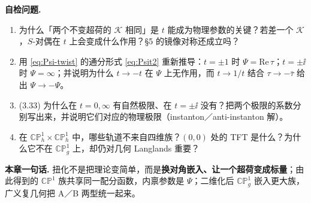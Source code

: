\noindent\textbf{自检问题.}
\begin{enumerate}[label=\arabic*.,itemsep=2pt,topsep=3pt]
\item 为什么「两个不变超荷的 $\mathcal K$ 相同」是 $t$ 能成为物理参数的关键？若差一个 $\mathcal K$，$S$-对偶在 $t$ 上会变成什么作用？§5 的镜像对称还成立吗？
\item 用 \eqref{eq:Psi-twist} 的通分形式 \eqref{eq:Psit2} 重新推导：$t=\pm1$ 时 $\Psi=\mathrm{Re}\,\tau$；$t=\pm\ii$ 时 $\Psi=\infty$；并说明为什么 $t\to-t$ 在 $\Psi$ 上无作用，而 $t\to1/t$ 结合 $\tau\to-\bar\tau$ 给出 $\Psi\to-\Psi$。
\item (3.33) 为什么在 $t=0,\infty$ 有自然极限、在 $t=\pm\ii$ 没有？把两个极限的系数分别写出来，并说明它们对应的物理极限（instanton／anti-instanton 解）。
\item 在 $\mathbb{CP}^1_h\times\mathbb{CP}^1_h$ 中，哪些轨道不来自四维族？$(0,0)$ 处的 TFT 是什么？为什么它不在 $\mathbb{CP}^1_g$ 上，却仍对几何 Langlands 重要？
\end{enumerate}

\enlargethispage{\baselineskip}
\noindent\textbf{本章一句话.} 扭化不是把理论变简单，而是\textbf{换对角嵌入、让一个超荷变成标量}；由此得到的 $\mathbb{CP}^1$ 族共享同一配分函数，内禀参数是 $\Psi$；二维化后 $\mathbb{CP}^1_g$ 嵌入更大族，广义复几何把 A／B 两型统一起来\pC{}。
